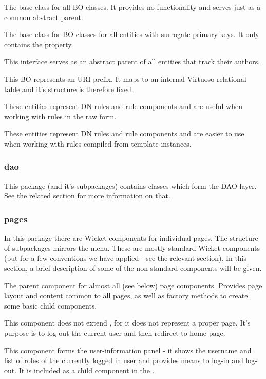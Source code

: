 \begin{description}[style=nextline,font=\ttfamily]
	\item[BusinessEntity] The base class for all BO classes. It provides no functionality and serves just as a common abstract parent.
	\item[EntityWithSurrogateKey] The base class for BO classes for all entities with surrogate primary keys. It only contains the  property.
	\item[AuthoredEntity] This interface serves as an abstract parent of all entities that track their authors.
	\item[Prefix] This BO represents an URI prefix. It maps to an internal Virtuoso relational table and it's structure is therefore fixed.
	\item[DNRule and DNRuleComponent] These entities represent DN rules and rule components and are useful when working with rules in the raw form.
	\item[CompiledDNRule and CompiledDNRuleComponent] These entities represent DN rules and rule components and are easier to use when working with rules compiled from template instances.
\end{description}

\subsubsection{dao}

This package (and it's subpackages) contains classes which form the DAO layer. See the related section for more information on that.

\subsubsection{pages}

In this package there are Wicket components for individual pages. The structure of subpackages mirrors the \WF menu. These are mostly standard Wicket components (but for a few conventions we have applied - see the relevant section). In this section, a brief description of some of the non-standard components will be given.

\begin{description}[style=nextline,font=\ttfamily]
	\item[FrontendPage] The parent component for almost all (see below) page components. Provides page layout and content common to all pages, as well as factory methods to create some basic child components.
	\item[LogoutPage] This component does not extend , for it does not represent a proper page. It's purpose is to log out the current user and then redirect to home-page.
	\item[UserPanel] This component forms the user-information panel - it shows the username and list of roles of the currently logged in user and provides means to log-in and log-out. It is included as a child component in the .
\end{description}
	
